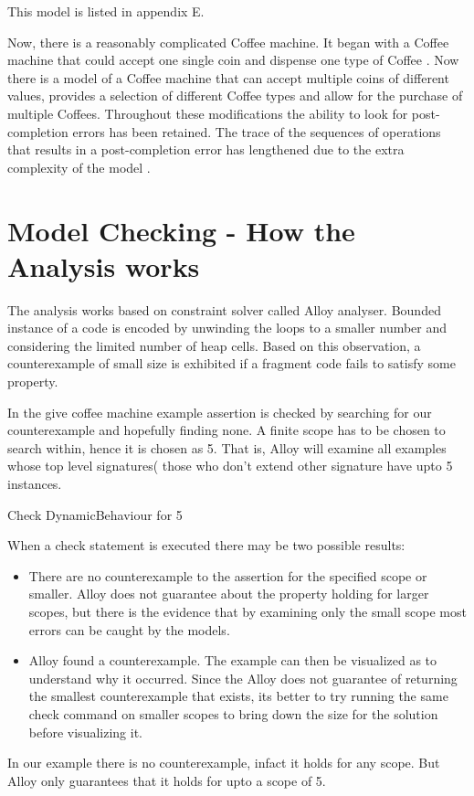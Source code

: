 \documentclass[a4paper,12pt]{report}
\begin{document}
\begin{onehalfspacing}
This model is listed in appendix E.

Now, there is a reasonably complicated Coffee machine. It began with a Coffee machine that could accept one single coin and dispense one type of Coffee \cite{RussellBoyatt}. Now there is a model of a Coffee machine that can accept multiple coins of different values, provides a selection of different Coffee types and allow for the purchase of multiple Coffees. Throughout these modifications the ability to look for post-completion errors has been retained. The trace of the sequences of operations that results in a post-completion error has lengthened due to the extra complexity of the model \cite{RussellBoyatt}.
 

\chapter{Model Checking - How the Analysis works}
\label{Working of analysis}

The analysis works based on constraint solver called Alloy analyser. Bounded instance of a code is encoded by unwinding the loops to a smaller number and considering the limited number of heap cells. Based on this observation, a counterexample of small size is exhibited if a fragment code fails to satisfy some property. 

In the give coffee machine example assertion is checked by searching for our counterexample and hopefully finding none. A finite scope has to be chosen to search within, hence it is chosen as 5. That is, Alloy will examine all examples whose top level signatures( those who don't extend other signature have upto 5 instances.

Check DynamicBehaviour for 5

When a check statement is executed there may be two possible results:
\begin{itemize}
\item There are no counterexample to the assertion for the specified scope or smaller. Alloy does not guarantee about the property holding for larger scopes, but there is the evidence that by examining only the small scope most errors can be caught by the models. 
\item Alloy found a counterexample. The example can then be visualized as to understand why it occurred. Since the Alloy does not guarantee of returning the smallest counterexample that exists, its better to try running the same check command on smaller scopes to bring down the size for the solution before visualizing it. 
\end{itemize}
In our example there is no counterexample, infact it holds for any scope. But Alloy only guarantees that it holds for upto a scope of 5.


\end{onehalfspacing}
\end{document}
